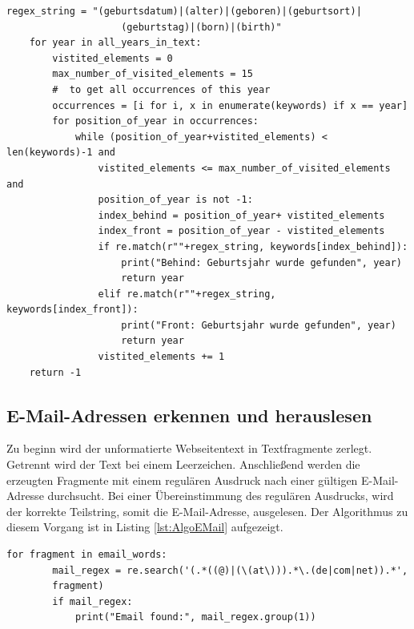 	\begin{lstlisting}[caption=Geburtsdatum herauslesen,label={lst:AlgoYearOfBirth}]
	regex_string = "(geburtsdatum)|(alter)|(geboren)|(geburtsort)|	
					(geburtstag)|(born)|(birth)"
	for year in all_years_in_text:
		vistited_elements = 0
		max_number_of_visited_elements = 15
		#  to get all occurrences of this year
		occurrences = [i for i, x in enumerate(keywords) if x == year]
		for position_of_year in occurrences:
			while (position_of_year+vistited_elements) < len(keywords)-1 and
				vistited_elements <= max_number_of_visited_elements and
				position_of_year is not -1:
				index_behind = position_of_year+ vistited_elements
				index_front = position_of_year - vistited_elements
				if re.match(r""+regex_string, keywords[index_behind]):
					print("Behind: Geburtsjahr wurde gefunden", year)
					return year
				elif re.match(r""+regex_string, keywords[index_front]):
					print("Front: Geburtsjahr wurde gefunden", year)
					return year
				vistited_elements += 1
	return -1
	\end{lstlisting} 
	\subsection{E-Mail-Adressen erkennen und herauslesen}
	Zu beginn wird der unformatierte Webseitentext in Textfragmente zerlegt. Getrennt wird der Text bei einem Leerzeichen. Anschließend werden die erzeugten Fragmente mit einem regulären Ausdruck nach einer gültigen E-Mail-Adresse durchsucht. Bei einer Übereinstimmung des regulären Ausdrucks, wird der korrekte Teilstring, somit die E-Mail-Adresse, ausgelesen. Der Algorithmus zu diesem Vorgang ist in Listing \ref{lst:AlgoEMail} aufgezeigt.\\
	
	\begin{lstlisting}[caption=E-Mail-Adressen herrauslesen,label={lst:AlgoEMail}]
	for fragment in email_words:
		mail_regex = re.search('(.*((@)|(\(at\))).*\.(de|com|net)).*',
		fragment)
		if mail_regex:
			print("Email found:", mail_regex.group(1))
	\end{lstlisting}   

